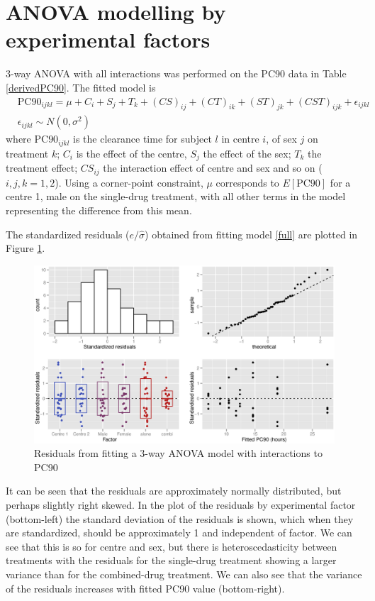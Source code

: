 \section{ANOVA modelling by experimental factors}
3-way ANOVA with all interactions was performed on the PC90 data in Table \ref{derivedPC90}. The fitted model is
\begin{eqnarray}
&\mathrm{PC}90_{ijkl}=\mu+C_i+S_j+T_k+(CS)_{ij}+(CT)_{ik}+(ST)_{jk}+(CST)_{ijk}+\epsilon_{ijkl}&\label{full}\\
&\epsilon_{ijkl}\sim N(0,\sigma^2)&\nonumber
\end{eqnarray}
where PC$90_{ijkl}$ is the clearance time for subject $l$ in centre $i$, of sex $j$ on treatment $k$; $C_i$ is the effect of the centre, $S_j$ the effect of the sex; $T_k$ the treatment effect; $CS_{ij}$ the interaction effect of centre and sex and so on ($i,j,k=1,2$). Using a corner-point constraint, $\mu$ corresponds to $E[\mathrm{PC}90]$ for a centre 1, male on the single-drug treatment, with all other terms in the model representing the difference from this mean.

\pagebreak
The standardized residuals ($e/\hat{\sigma}$) obtained from fitting model \ref{full} are plotted in Figure \ref{aovloglinres}.
\begin{figure}[ht]
\includegraphics[width=6.5in]{aovloglinres.eps} 
\caption{Residuals from fitting a 3-way ANOVA model with interactions to PC90}
\label{aovloglinres}
\end{figure}

It can be seen that the residuals are approximately normally distributed, but perhaps slightly right skewed. In the plot of the residuals by experimental factor (bottom-left) the standard deviation of the residuals is shown, which when they are standardized, should be approximately 1 and independent of factor. We can see that this is so for centre and sex, but there is heteroscedasticity between treatments with the residuals for the single-drug treatment showing a larger variance than for the combined-drug treatment.
We can also see that the variance of the residuals increases with fitted PC90 value (bottom-right).

